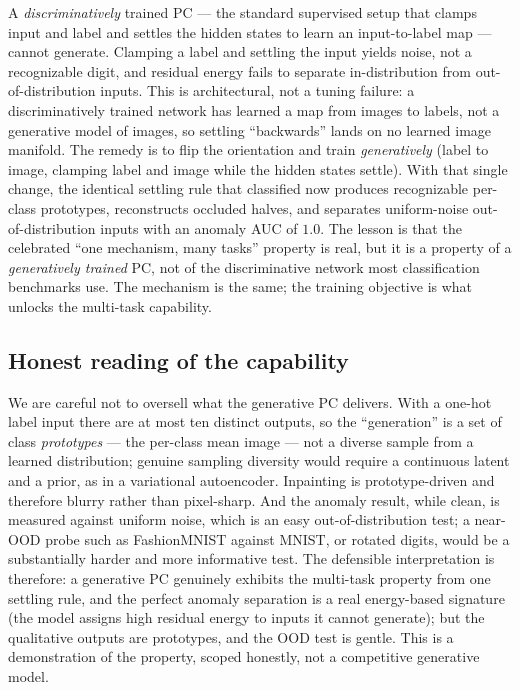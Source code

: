 A \emph{discriminatively} trained PC --- the standard supervised setup that clamps input and label
and settles the hidden states to learn an input-to-label map --- cannot generate. Clamping a label
and settling the input yields noise, not a recognizable digit, and residual energy fails to separate
in-distribution from out-of-distribution inputs. This is architectural, not a tuning failure: a
discriminatively trained network has learned a map from images to labels, not a generative model of
images, so settling ``backwards'' lands on no learned image manifold. The remedy is to flip the
orientation and train \emph{generatively} (label to image, clamping label and image while the hidden
states settle). With that single change, the identical settling rule that classified now produces
recognizable per-class prototypes, reconstructs occluded halves, and separates uniform-noise
out-of-distribution inputs with an anomaly AUC of $1.0$. The lesson is that the celebrated
``one mechanism, many tasks'' property is real, but it is a property of a \emph{generatively trained}
PC, not of the discriminative network most classification benchmarks use. The mechanism is the same;
the training objective is what unlocks the multi-task capability.

\subsection{Honest reading of the capability}

We are careful not to oversell what the generative PC delivers. With a one-hot label input there are
at most ten distinct outputs, so the ``generation'' is a set of class \emph{prototypes} --- the
per-class mean image --- not a diverse sample from a learned distribution; genuine sampling diversity
would require a continuous latent and a prior, as in a variational autoencoder. Inpainting is
prototype-driven and therefore blurry rather than pixel-sharp. And the anomaly result, while clean,
is measured against uniform noise, which is an easy out-of-distribution test; a near-OOD probe such
as FashionMNIST against MNIST, or rotated digits, would be a substantially harder and more
informative test. The defensible interpretation is therefore: a generative PC genuinely exhibits the
multi-task property from one settling rule, and the perfect anomaly separation is a real energy-based
signature (the model assigns high residual energy to inputs it cannot generate); but the qualitative
outputs are prototypes, and the OOD test is gentle. This is a demonstration of the property, scoped
honestly, not a competitive generative model.

